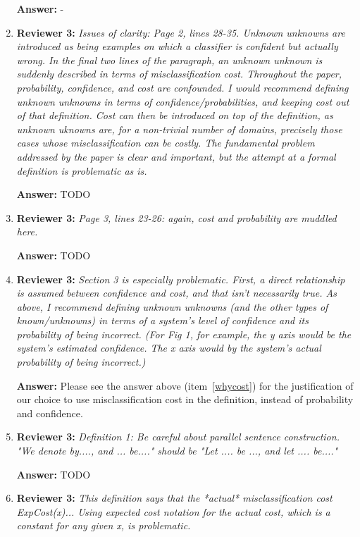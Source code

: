 \documentclass[letterpaper]{article}
\begin{document}
\begin{enumerate}
\textbf{Answer:} -

\item \textbf{Reviewer 3:} \emph{ Issues of clarity: Page 2, lines 28-35.  Unknown unknowns are introduced as being examples on which a classifier is confident but actually wrong.  In the final two lines of the paragraph, an unknown unknown is suddenly described in terms of misclassification cost.  Throughout the paper, probability, confidence, and cost are confounded.  I would recommend defining unknown unknowns in terms of confidence/probabilities, and keeping cost out of that definition. Cost can then be introduced on top of the definition, as unknown uknowns are, for a non-trivial number of domains, precisely those cases whose misclassification can be costly.  The fundamental problem addressed by the paper is clear and important, but the attempt at a formal definition is problematic as is.}

\textbf{Answer:} TODO

\item \textbf{Reviewer 3:} \emph{ Page 3, lines 23-26: again, cost and probability are muddled here.}

\textbf{Answer:} TODO

\item \textbf{Reviewer 3:} \emph{ Section 3 is especially problematic.  First, a direct relationship is assumed between confidence and cost, and that isn't necessarily true. As above, I recommend defining unknown unknowns (and the other types of known/unknowns) in terms of a system's level of confidence and its probability of being incorrect.  (For Fig 1, for example, the y axis would be the system's estimated confidence.  The x axis would by the system's actual probability of being incorrect.)}

\textbf{Answer:} Please see the answer above (item~\ref{whycost}) for the justification of our choice to use misclassification cost in the definition, instead of probability and confidence. 

\item \textbf{Reviewer 3:} \emph{Definition 1: Be careful about parallel sentence construction.  "We denote by...., and ... be...." should be "Let .... be ..., and let .... be...."}

\textbf{Answer:} TODO

\item \textbf{Reviewer 3:} \emph{ This definition says that the *actual* misclassification cost ExpCost(x)... Using expected cost notation for the actual cost, which is a constant for any given x, is problematic.}


\end{enumerate}
\end{document}
